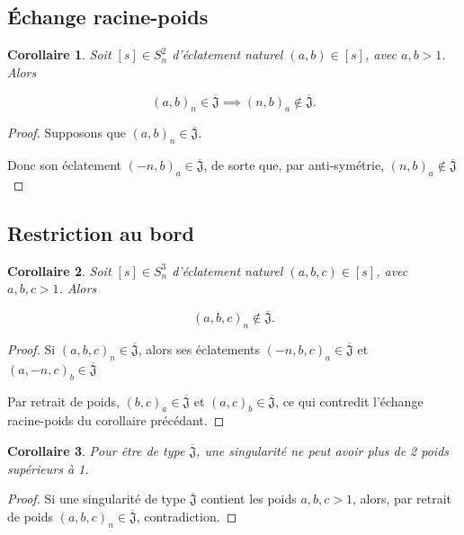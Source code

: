 \documentclass{article}
\newtheorem{corollary}{Corollaire}
\newcommand{\J}{\mathfrak{J}}
\newcommand{\JS}{\overline{\J}}
\begin{document}
\newpage

\subsection{Échange racine-poids}

\begin{corollary}
    Soit $[s] \in S_n^2$ d'éclatement naturel $(a, b) \in [s]$, avec $a, b > 1$. Alors
    
    \[ {(a, b)}_n \in \JS \implies {(n, b)}_a \not \in \JS. \]
\end{corollary}

\begin{proof}
    Supposons que ${(a, b)}_n \in \JS$.

    Donc son éclatement ${(-n, b)}_a \in \JS$, de sorte que, par anti-symétrie, ${(n, b)}_a \not \in \JS$
\end{proof}

\subsection{Restriction au bord}

\begin{corollary}
    Soit $[s] \in S_n^3$ d'éclatement naturel $(a, b, c) \in [s]$, avec $a, b, c > 1$. Alors
    
    \[ {(a, b, c)}_n \not \in \JS. \]
\end{corollary}

\begin{proof}
    Si ${(a, b, c)}_n \in \JS$, alors ses éclatements ${(-n, b, c)}_a \in \JS$ et ${(a, -n, c)}_b \in \JS$

    Par retrait de poids, ${(b, c)}_a \in \JS$ et ${(a, c)}_b \in \JS$, ce qui contredit l'échange racine-poids du corollaire précédant.
\end{proof}

\begin{corollary}
    Pour être de type $\JS$, une singularité ne peut avoir plus de 2 poids supérieurs à 1.
\end{corollary}

\begin{proof}
    Si une singularité de type $\JS$ contient les poids $a, b, c > 1$, alors, par retrait de poids ${(a, b, c)}_n \in \JS$, contradiction.
\end{proof}
\end{document}

